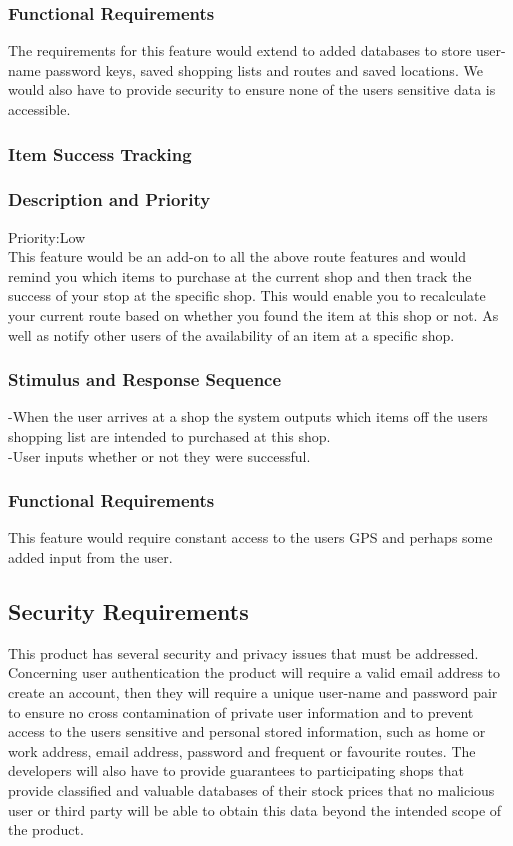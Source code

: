 \documentclass[12pt]{article}
\begin{document}
 \subsubsection*{Functional Requirements}
The requirements for this feature would extend to added databases to store user-name password keys,  saved shopping lists and routes and saved locations. We would also have to provide security to ensure none of the users sensitive data is accessible. 

 \subsubsection{Item Success Tracking}
\subsubsection*{Description and Priority}
 Priority:Low\\
 This feature would be an add-on to all the above route features and would remind you which items to purchase at the current shop and then track the success of your stop at the specific shop. This would enable you to recalculate your current route based on whether you found the item at this shop or not. As well as notify other users of the availability of an item at a specific shop.  
 \subsubsection*{Stimulus and Response Sequence}
-When the user arrives at a shop the system outputs which items off  the users shopping list are intended to purchased at this shop.\\
-User  inputs whether or not they were successful.
 \subsubsection*{Functional Requirements}
 This feature would require constant access to the users GPS and perhaps some added input from the user.
 
 \subsection{Security Requirements}
 This product has several security and privacy issues that must be addressed. Concerning user authentication the product will require a valid email address to create an account, then they will require a unique user-name and password pair to ensure no cross contamination of private user information and to prevent access to the users sensitive and personal stored information, such as home or work address, email address, password and frequent or favourite routes. The developers will also have to provide guarantees to participating shops that provide classified and valuable databases of their stock prices that no malicious user or third party will be able to obtain this data beyond the intended scope of the product. 
\end{document}
